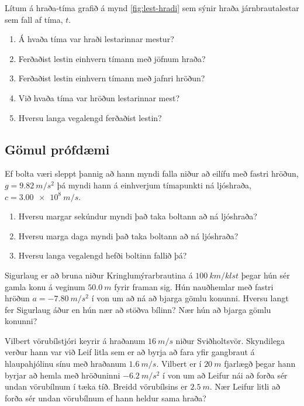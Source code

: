 \begin{enumerate}[label = \textbf{Dæmi \thechapter.\arabic*.}]
\begin{minipage}{\linewidth}
\item Lítum á hraða-tíma grafið á mynd \ref{fig:lest-hradi} sem sýnir hraða járnbrautalestar sem fall af tíma, $t$.
\begin{enumerate}[label = \textbf{(\alph*)}]
    \item Á hvaða tíma var hraði lestarinnar mestur?
    \item Ferðaðist lestin einhvern tímann með jöfnum hraða?
    \item Ferðaðist lestin einhvern tímann með jafnri hröðun?
    \item Við hvaða tíma var hröðun lestarinnar mest?
    \item Hversu langa vegalengd ferðaðist lestin?
\end{enumerate}

\end{minipage}


\newpage

\subsection*{Gömul prófdæmi}

\item Ef bolta væri sleppt þannig að hann myndi falla niður að eilífu með fastri hröðun, $g = \SI{9.82}{m/s^2}$ þá myndi hann á einhverjum tímapunkti ná ljóshraða, $c = \SI{3.00e8}{m/s}$.
\begin{enumerate}[label = \textbf{(\alph*)}]
\item Hversu margar sekúndur myndi það taka boltann að ná ljóshraða?
\item Hversu marga daga myndi það taka boltann að ná ljóshraða?
\item Hversu langa vegalengd hefði boltinn fallið þá?
\end{enumerate}

\item Sigurlaug er að bruna niður Kringlumýrarbrautina á $\SI{100}{km/klst}$ þegar hún sér gamla konu á veginum $\SI{50.0}{m}$ fyrir framan sig. Hún nauðhemlar með fastri hröðun $a = -\SI{7.80}{m/s^2}$ í von um að ná að bjarga gömlu konunni. Hversu langt fer Sigurlaug áður en hún nær að stöðva bílinn? Nær hún að bjarga gömlu konunni?

\item Vilbert vörubílstjóri keyrir á hraðanum $\SI{16}{m/s}$ niður Sviðholtsvör. Skyndilega verður hann var við Leif litla sem er að byrja að fara yfir gangbraut á hlaupahjólinu sínu með hraðanum $\SI{1.6}{m/s}$. Vilbert er í $\SI{20}{m}$ fjarlægð þegar hann byrjar að hemla með hröðuninni $\SI{-6.2}{m/s^2}$ í von um að Leifur nái að forða sér undan vörubílnum í tæka tíð. Breidd vörubílsins er $\SI{2.5}{m}$. Nær Leifur litli að forða sér undan vörubílnum ef hann heldur sama hraða?


\end{enumerate}
